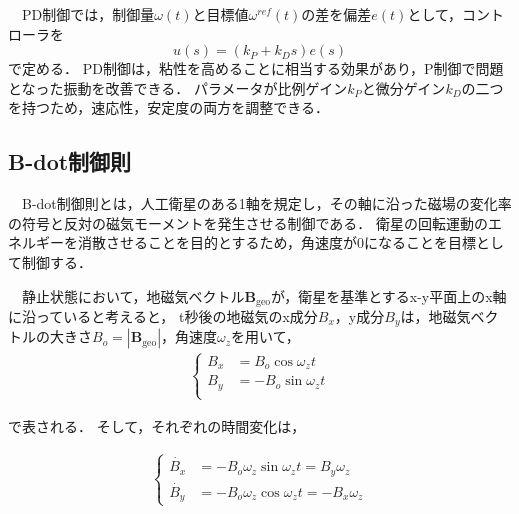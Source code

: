 　PD制御では，制御量$\omega(t)$と目標値$\omega^{ref}(t)$の差を偏差$e(t)$として，コントローラを
\begin{equation}
    u(s) = (k_P+k_Ds)e(s)
\end{equation}
で定める．
PD制御は，粘性を高めることに相当する効果があり，P制御で問題となった振動を改善できる．
パラメータが比例ゲイン$k_P$と微分ゲイン$k_D$の二つを持つため，速応性，安定度の両方を調整できる． 




\subsection{B-dot制御則}
　B-dot制御則とは，人工衛星のある1軸を規定し，その軸に沿った磁場の変化率の符号と反対の磁気モーメントを発生させる制御である．
衛星の回転運動のエネルギーを消散させることを目的とするため，角速度が0になることを目標として制御する．

　静止状態において，地磁気ベクトル$\boldsymbol{B}_\mathrm{geo}$が，衛星を基準とするx-y平面上のx軸に沿っていると考えると，
t秒後の地磁気のx成分$B_x$，y成分$B_y$は，地磁気ベクトルの大きさ$B_o=|\boldsymbol{B}_\mathrm{geo}|$，角速度$\omega_z$を用いて，
\begin{align}
    \left\{
        \begin{aligned}
            B_x &= B_o\cos\omega_zt\\
            B_y &= -B_o\sin\omega_zt\\
        \end{aligned}                    
    \right.
\end{align}

で表される．
そして，それぞれの時間変化は，

\begin{align}
    \left\{
        \begin{aligned}
            \dot{B_x} &= -B_o\omega_z\sin\omega_zt = B_y\omega_z\\
            \dot{B_y} &= -B_o\omega_z\cos\omega_zt = -B_x\omega_z
        \end{aligned}                    
    \right.
\end{align}

